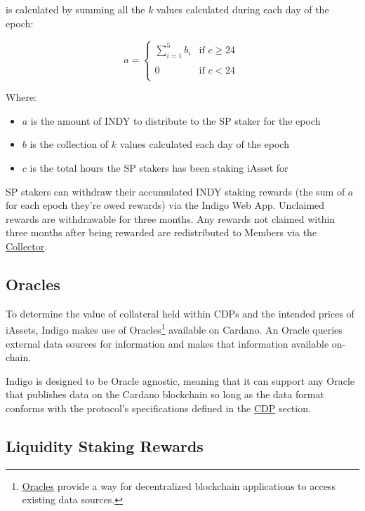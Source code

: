 \documentclass{article}
\begin{document}
\begin{sloppypar}
is calculated by summing all the \(k\) values calculated during each day
of the epoch:

\[a = \left\{ \begin{matrix}
  \sum_{i = 1}^{5}b_{i} & \text{if\ }c \geq 24 \\ \\
  0 & \text{if\ }c < 24 \\
  \end{matrix} \right.\ \]

Where:

\begin{itemize}
\item
  \(a\) is the amount of INDY to distribute to the SP staker for the
  epoch
\item
  \(b\) is the collection of \(k\) values calculated each day of the
  epoch
\item
  \(c\) is the total hours the SP stakers has been staking iAsset for
\end{itemize}

SP stakers can withdraw their accumulated INDY staking rewards (the sum
of \(a\) for each epoch they're owed rewards) via the Indigo Web App.
Unclaimed rewards are withdrawable for three months. Any rewards not
claimed within three months after being rewarded are redistributed to
Members via the \protect\hyperlink{protocol-profit-sharing}{Collector}.

\hypertarget{oracles}{%
\subsection{Oracles}\label{oracles}}

To determine the value of collateral held within CDPs and the intended
prices of iAssets, Indigo makes use of Oracles\footnote{\href{https://chain.link/education/blockchain-oracles}{Oracles}
  provide a way for decentralized blockchain applications to access
  existing data sources.} available on Cardano. An Oracle queries
external data sources for information and makes that information
available on-chain.

Indigo is designed to be Oracle agnostic, meaning that it can support
any Oracle that publishes data on the Cardano blockchain so long as the
data format conforms with the protocol's specifications defined in the
\protect\hyperlink{cdp}{CDP} section.

\hypertarget{liquidity-staking-rewards}{%
\subsection{Liquidity Staking Rewards}\label{liquidity-staking-rewards}}


\end{sloppypar}
\end{document}

